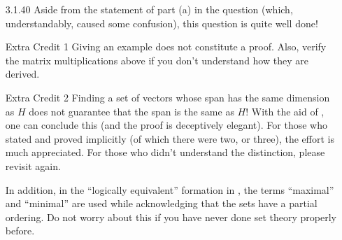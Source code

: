 \documentclass{amsart}
\theoremstyle{definition}
\theoremstyle{definition}
\DeclareMathOperator{\1}{\mathbbm{1}}
\begin{document}
\begin{enumerate}
	
	
	\item[3.1.40] Aside from the statement of part (a) in the question (which, understandably, caused some confusion), this question is quite well done!
	
	
	
	\item[Extra Credit 1] Giving an example does not constitute a proof. Also, verify the matrix multiplications above if you don't understand how they are derived.
	
	
	
	
	\item[Extra Credit 2] Finding a set of vectors whose span has the same dimension as $H$ does not guarantee that the span is the same as $H$! With the aid of , one can conclude this (and the proof is deceptively elegant). For those who stated and proved  implicitly (of which there were two, or three), the effort is much appreciated. For those who didn't understand the distinction, please revisit  again.
	
	In addition, in the ``logically equivalent'' formation in , the terms ``maximal'' and ``minimal'' are used while acknowledging that the sets have a partial ordering. Do not worry about this if you have never done set theory properly before.
	
\end{enumerate}


	
\end{document}
